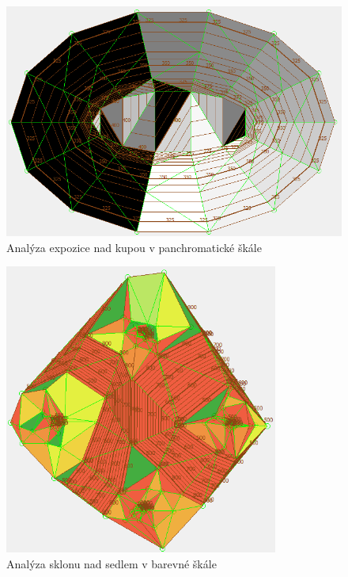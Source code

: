 \documentclass[a4paper,11pt,twoside]{article}
\begin{document}
\vspace{0.2cm}
\begin{figure}[hbt!] 
\begin{center}
\includegraphics[width=14cm]{pictures/hill_panchromatic_aspect.PNG} 
\caption[Analýza expozice nad kupou v panchromatické škále]{Analýza expozice nad kupou v panchromatické škále}
\label{fig:hill_panchromatic_aspect}
\end{center}
\end{figure}


\vspace{0.2cm}
\begin{figure}[hbt!] 
\begin{center}
\includegraphics[width=9cm]{pictures/saddle_colorful_slope.PNG} 
\caption[Analýza sklonu nad sedlem v barevné škále]{Analýza sklonu nad sedlem v barevné škále}
\label{fig:saddle_colorful_slope}
\end{center}
\end{figure}
\end{document}
